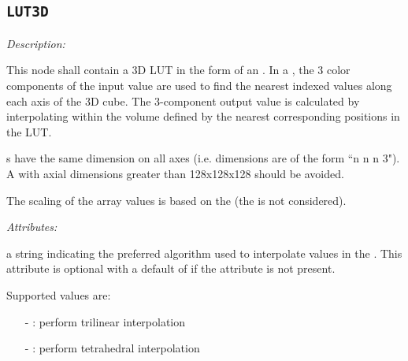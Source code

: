 \subsection{\texttt{LUT3D}}

\emph{Description:} \par
This node shall contain a 3D LUT in the form of an . In a , the 3 color components of the input value are used to find the nearest indexed values along each axis of the 3D cube. The 3-component output value is calculated by interpolating within the volume defined by the nearest corresponding positions in the LUT. 

s have the same dimension on all axes (i.e.  dimensions are of the form ``n n n 3"). A  with axial dimensions greater than 128x128x128 should be avoided.

The scaling of the array values is based on the  (the  is not considered).


\emph{Attributes:}
\begin{xmlfields}
	\xmlitem[interpolation][optional] a string indicating the preferred algorithm used to interpolate values in the . This attribute is optional with a default of  if the attribute is not present. \par 	Supported values are: 
	    \begin{itemize}
            \item[-] : perform trilinear interpolation
            
            \item[-] : perform tetrahedral interpolation
        \end{itemize}
\end{xmlfields}

